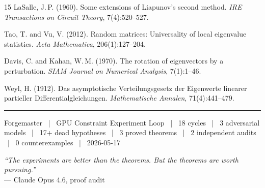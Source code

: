 \documentclass[11pt]{article}
\begin{document}
\begin{thebibliography}{15}
LaSalle, J.\,P. (1960).
Some extensions of Liapunov's second method.
\textit{IRE Transactions on Circuit Theory}, 7(4):520--527.

Tao, T. and Vu, V. (2012).
Random matrices: Universality of local eigenvalue statistics.
\textit{Acta Mathematica}, 206(1):127--204.

Davis, C. and Kahan, W.\,M. (1970).
The rotation of eigenvectors by a perturbation.
\textit{SIAM Journal on Numerical Analysis}, 7(1):1--46.

Weyl, H. (1912).
Das asymptotische Verteilungsgesetz der Eigenwerte linearer partieller Differentialgleichungen.
\textit{Mathematische Annalen}, 71(4):441--479.

\end{thebibliography}

\vspace{1em}
\noindent\rule{\columnwidth}{0.4pt}
\vspace{0.5em}

{\small
\noindent Forgemaster \raisebox{-0.5ex}{\textbf{\texttimes}} ~|~ GPU Constraint Experiment Loop ~|~ 18 cycles ~|~ 3 adversarial models ~|~ 17+ dead hypotheses ~|~ 3 proved theorems ~|~ 2 independent audits ~|~ 0 counterexamples ~|~ 2026-05-17

\vspace{1em}

\noindent\textit{``The experiments are better than the theorems. But the theorems are worth pursuing.''}
\\--- Claude Opus 4.6, proof audit
}
\end{document}
